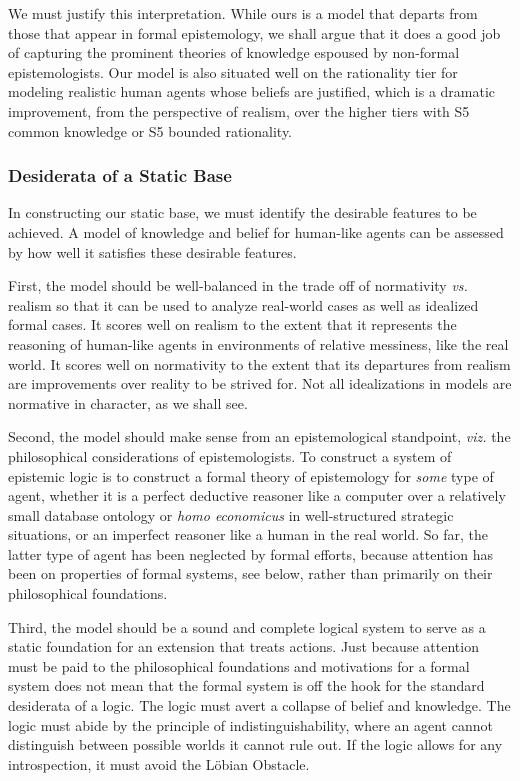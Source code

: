 We must justify this interpretation. While ours is a model that departs from those that appear in formal epistemology, we shall argue that it does a good job of capturing the prominent theories of knowledge espoused by non-formal epistemologists. Our model is also situated well on the rationality tier for modeling realistic human agents whose beliefs are justified, which is a dramatic improvement, from the perspective of realism, over the higher tiers with S5 common knowledge or S5 bounded rationality.

\subsubsection{Desiderata of a Static Base}
In constructing our static base, we must identify the desirable features to be achieved. A model of knowledge and belief for human-like agents can be assessed by how well it satisfies these desirable features. 

First, the model should be well-balanced in the trade off of normativity \emph{vs.} realism so that it can be used to analyze real-world cases as well as idealized formal cases. It scores well on realism to the extent that it represents the reasoning of human-like agents in environments of relative messiness, like the real world. It scores well on normativity to the extent that its departures from realism are improvements over reality to be strived for. Not all idealizations in models are normative in character, as we shall see.

Second, the model should make sense from an epistemological standpoint, \emph{viz.} the philosophical considerations of epistemologists. To construct a system of epistemic logic is to construct a formal theory of epistemology for \emph{some} type of agent, whether it is a perfect deductive reasoner like a computer over a relatively small database ontology or \emph{homo economicus} in well-structured strategic situations, or an imperfect reasoner like a human in the real world. So far, the latter type of agent has been neglected by formal efforts, because attention has been on properties of formal systems, see below, rather than primarily on their philosophical foundations. 

Third, the model should be a sound and complete logical system to serve as a static foundation for an extension that treats actions. Just because attention must be paid to the philosophical foundations and motivations for a formal system does not mean that the formal system is off the hook for the standard desiderata of a logic. The logic must avert a collapse of belief and knowledge. The logic must abide by the principle of indistinguishability, where an agent cannot distinguish between possible worlds it cannot rule out. If the logic allows for any introspection, it must avoid the L\"obian Obstacle.

